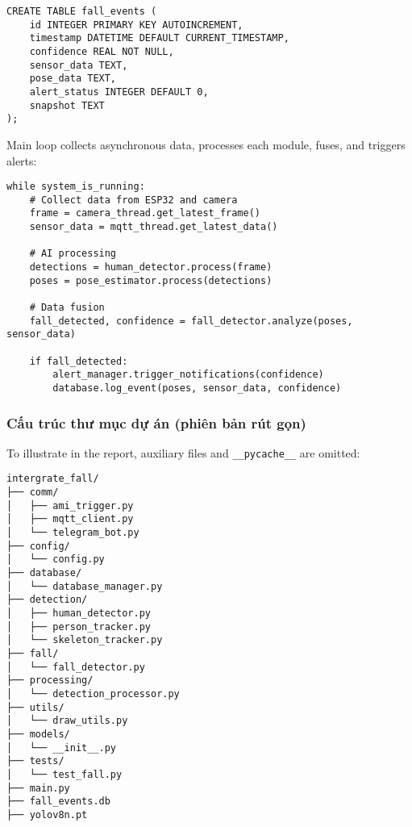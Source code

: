 \begin{verbatim}
CREATE TABLE fall_events (
    id INTEGER PRIMARY KEY AUTOINCREMENT,
    timestamp DATETIME DEFAULT CURRENT_TIMESTAMP,
    confidence REAL NOT NULL,
    sensor_data TEXT,
    pose_data TEXT,
    alert_status INTEGER DEFAULT 0,
    snapshot TEXT
);
\end{verbatim}

Main loop collects asynchronous data, processes each module, fuses, and triggers alerts:

\begin{verbatim}
while system_is_running:
    # Collect data from ESP32 and camera
    frame = camera_thread.get_latest_frame()
    sensor_data = mqtt_thread.get_latest_data()
    
    # AI processing
    detections = human_detector.process(frame)
    poses = pose_estimator.process(detections)
    
    # Data fusion
    fall_detected, confidence = fall_detector.analyze(poses, sensor_data)
    
    if fall_detected:
        alert_manager.trigger_notifications(confidence)
        database.log_event(poses, sensor_data, confidence)
\end{verbatim}

\subsubsection{Cấu trúc thư mục dự án (phiên bản rút gọn)}
\label{subsubsec:project_structure}

To illustrate in the report, auxiliary files and \texttt{\_\_pycache\_\_} are omitted:

\begin{verbatim}
intergrate_fall/
├── comm/
│   ├── ami_trigger.py
│   ├── mqtt_client.py
│   └── telegram_bot.py
├── config/
│   └── config.py
├── database/
│   └── database_manager.py
├── detection/
│   ├── human_detector.py
│   ├── person_tracker.py
│   └── skeleton_tracker.py
├── fall/
│   └── fall_detector.py
├── processing/
│   └── detection_processor.py
├── utils/
│   └── draw_utils.py
├── models/
│   └── __init__.py
├── tests/
│   └── test_fall.py
├── main.py
├── fall_events.db
├── yolov8n.pt
\end{verbatim}
